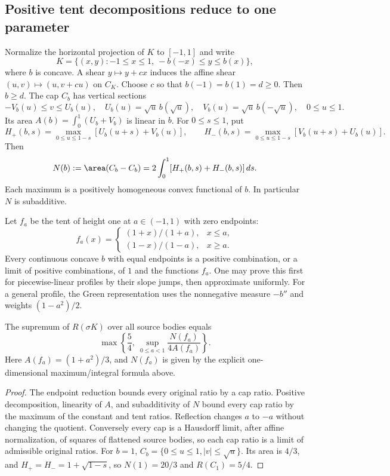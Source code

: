 \subsection{Positive tent decompositions reduce to one parameter}
Normalize the horizontal projection of $K$ to $[-1,1]$ and write
\[
 K=\{(x,y):-1\leq x\leq1,\ -b(-x)\leq y\leq b(x)\},
\]
where $b$ is concave. A shear $y\mapsto y+cx$ induces the affine shear $(u,v)\mapsto(u,v+cu)$ on $C_K$. Choose $c$ so that $b(-1)=b(1)=d\geq0$. Then $b\geq d$.
The cap $C_b$ has vertical sections
\[
 -V_b(u)\leq v\leq U_b(u),\quad
 U_b(u)=\sqrt u\,b(\sqrt u),\quad V_b(u)=\sqrt u\,b(-\sqrt u),\quad 0\leq u\leq1.
\]
Its area $A(b)=\int_0^1(U_b+V_b)$ is linear in $b$. For $0\leq s\leq1$, put
\[
 H_+(b,s)=\max_{0\leq u\leq1-s}[U_b(u+s)+V_b(u)],\qquad
 H_-(b,s)=\max_{0\leq u\leq1-s}[V_b(u+s)+U_b(u)].
\]
Then
\[
 N(b):=\area(C_b-C_b)=2\int_0^1[H_+(b,s)+H_-(b,s)]\,ds.
\]
Each maximum is a positively homogeneous convex functional of $b$. In particular $N$ is subadditive.

Let $f_a$ be the tent of height one at $a\in(-1,1)$ with zero endpoints:
\[
 f_a(x)=\begin{cases}(1+x)/(1+a),&x\leq a,\\(1-x)/(1-a),&x\geq a.\end{cases}
\]
Every continuous concave $b$ with equal endpoints is a positive combination, or a limit of positive combinations, of $1$ and the functions $f_a$. One may prove this first for piecewise-linear profiles by their slope jumps, then approximate uniformly. For a general profile, the Green representation uses the nonnegative measure $-b''$ and weights $(1-a^2)/2$.
\begin{theorem}
The supremum of $R(\sigma K)$ over all source bodies equals
\[
 \max\left\{\frac54,\ \sup_{0\leq a<1}\frac{N(f_a)}{4A(f_a)}\right\}.
\]
Here $A(f_a)=(1+a^2)/3$, and $N(f_a)$ is given by the explicit one-dimensional maximum/integral formula above.
\end{theorem}
\begin{proof}
The endpoint reduction bounds every original ratio by a cap ratio. Positive decomposition, linearity of $A$, and subadditivity of $N$ bound every cap ratio by the maximum of the constant and tent ratios. Reflection changes $a$ to $-a$ without changing the quotient. Conversely every cap is a Hausdorff limit, after affine normalization, of squares of flattened source bodies, so each cap ratio is a limit of admissible original ratios. For $b=1$, $C_b=\{0\leq u\leq1, |v|\leq\sqrt u\}$. Its area is $4/3$, and $H_+=H_-=1+\sqrt{1-s}$, so $N(1)=20/3$ and $R(C_1)=5/4$.
\end{proof}

